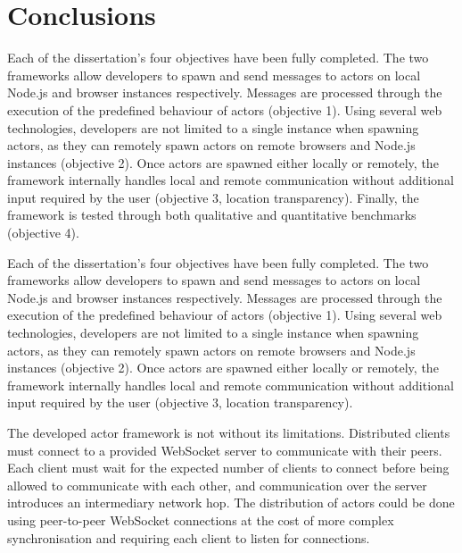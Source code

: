 \documentclass[lettersize,journal]{IEEEtran}
\begin{document}
\section{Conclusions}
Each of the dissertation's four objectives have been fully completed. The two frameworks allow developers to spawn and send messages to actors on local Node.js and browser instances respectively. Messages are processed through the execution of the predefined behaviour of actors (objective 1). Using several web technologies, developers are not limited to a single instance when spawning actors, as they can remotely spawn actors on remote browsers and Node.js instances (objective 2). Once actors are spawned either locally or remotely, the framework internally handles local and remote communication without additional input required by the user (objective 3, location transparency). Finally, the framework is tested through both qualitative and quantitative benchmarks (objective 4).

Each of the dissertation's four objectives have been fully completed. The two frameworks allow developers to spawn and send messages to actors on local Node.js and browser instances respectively. Messages are processed through the execution of the predefined behaviour of actors (objective 1). Using several web technologies, developers are not limited to a single instance when spawning actors, as they can remotely spawn actors on remote browsers and Node.js instances (objective 2). Once actors are spawned either locally or remotely, the framework internally handles local and remote communication without additional input required by the user (objective 3, location transparency).

The developed actor framework is not without its limitations. Distributed clients must connect to a provided WebSocket server to communicate with their peers. Each client must wait for the expected number of clients to connect before being allowed to communicate with each other, and communication over the server introduces an intermediary network hop. The distribution of actors could be done using peer-to-peer WebSocket connections at the cost of more complex synchronisation and requiring each client to listen for connections.


\end{document}
